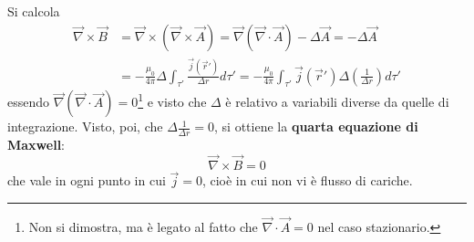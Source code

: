 \documentclass[10pt, a4paper]{scrartcl}
\numberwithin{equation}{subsection}
\theoremstyle{style1}
\begin{document}
Si calcola
\begin{equation}
	\begin{split}
		\vec{\nabla }\times \vec{B} &= \vec{\nabla }\times (\vec{\nabla }\times \vec{A}) = \vec{\nabla }(\vec{\nabla }\cdot \vec{A}) - \Delta  \vec{A} = -\Delta \vec{A}\\
					    &= - \frac{\mu_0}{4\pi}\Delta  \int_{\tau '} \frac{\vec{j}(\vec{r}')}{\Delta r}d\tau '= -\frac{\mu_0}{4 \pi} \int_{\tau '} \vec{j}(\vec{r}') \Delta  \left(\frac{1}{\Delta r}\right) d\tau '
	\end{split}
\end{equation}
essendo $\vec{\nabla }(\vec{\nabla }\cdot \vec{A}) =0 $\footnote{Non si dimostra, ma \`e legato al fatto che $\vec{\nabla }\cdot\vec{A} =0 $ nel caso stazionario.} e visto che $\Delta $ \`e relativo a variabili diverse da quelle di integrazione. Visto, poi, che $\Delta  \frac{1}{\Delta r} = 0$, si ottiene la \textbf{quarta equazione di Maxwell}:
\begin{equation}
	\vec{\nabla }\times \vec{B} = 0
\end{equation}
che vale in ogni punto in cui $\vec{j}=0$, cio\`e in cui non vi \`e flusso di cariche. 
\end{document}
